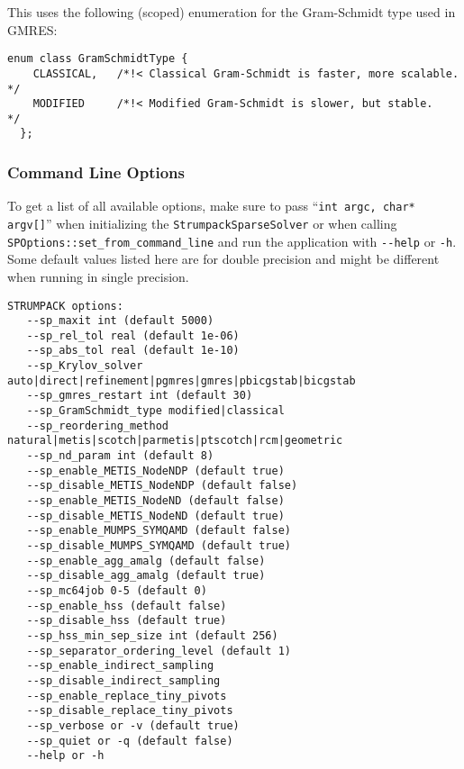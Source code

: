 \documentclass{article}
\begin{document}
This uses the following (scoped) enumeration for the Gram-Schmidt type
used in GMRES:
\begin{lstlisting}[style=C]
  enum class GramSchmidtType {
    CLASSICAL,   /*!< Classical Gram-Schmidt is faster, more scalable.   */
    MODIFIED     /*!< Modified Gram-Schmidt is slower, but stable.       */
  };
\end{lstlisting}

\subsubsection{Command Line Options}
To get a list of all available options, make sure to pass
``\lstinline[style=C]!int argc, char* argv[]!'' when initializing the
\lstinline[style=C]!StrumpackSparseSolver! or when calling
\lstinline[style=C]!SPOptions::set_from_command_line! and run the
application with \lstinline[style=Bash]!--help! or
\lstinline[style=Bash]!-h!. Some default values listed here are for
double precision and might be different when running in single
precision.
\begin{lstlisting}[style=Bash]
 STRUMPACK options:
   --sp_maxit int (default 5000)
   --sp_rel_tol real (default 1e-06)
   --sp_abs_tol real (default 1e-10)
   --sp_Krylov_solver auto|direct|refinement|pgmres|gmres|pbicgstab|bicgstab
   --sp_gmres_restart int (default 30)
   --sp_GramSchmidt_type modified|classical
   --sp_reordering_method natural|metis|scotch|parmetis|ptscotch|rcm|geometric
   --sp_nd_param int (default 8)
   --sp_enable_METIS_NodeNDP (default true)
   --sp_disable_METIS_NodeNDP (default false)
   --sp_enable_METIS_NodeND (default false)
   --sp_disable_METIS_NodeND (default true)
   --sp_enable_MUMPS_SYMQAMD (default false)
   --sp_disable_MUMPS_SYMQAMD (default true)
   --sp_enable_agg_amalg (default false)
   --sp_disable_agg_amalg (default true)
   --sp_mc64job 0-5 (default 0)
   --sp_enable_hss (default false)
   --sp_disable_hss (default true)
   --sp_hss_min_sep_size int (default 256)
   --sp_separator_ordering_level (default 1)
   --sp_enable_indirect_sampling
   --sp_disable_indirect_sampling
   --sp_enable_replace_tiny_pivots
   --sp_disable_replace_tiny_pivots
   --sp_verbose or -v (default true)
   --sp_quiet or -q (default false)
   --help or -h
\end{lstlisting}
\end{document}
